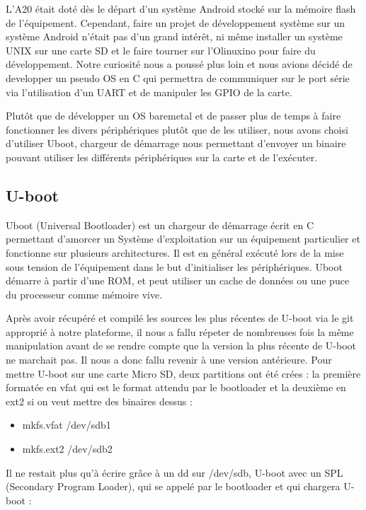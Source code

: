 \documentclass[frenchb]{article}
\begin{document}
L'A20 était doté dès le départ d'un système Android stocké sur la mémoire flash de l'équipement. Cependant, faire un projet de développement système sur un système Android n'était pas d'un grand intérêt, ni même installer un système UNIX sur une carte SD et le faire tourner sur l'Olinuxino pour faire du développement. Notre curiosité nous a poussé plus loin et nous avions décidé de developper un pseudo OS en C qui permettra de communiquer sur le port série via l'utilisation d'un UART et de manipuler les GPIO de la carte.

Plutôt que de développer un OS baremetal et de passer plus de temps à faire fonctionner les divers périphériques plutôt que de les utiliser, nous avons choisi d'utiliser Uboot, chargeur de démarrage nous permettant d'envoyer un binaire pouvant utiliser les différents périphériques sur la carte et de l'exécuter.
 
\subsection{U-boot}

Uboot (Universal Bootloader) est un chargeur de démarrage écrit en C permettant d'amorcer un Système d'exploitation sur un équipement particulier et fonctionne sur plusieurs architectures. Il est en général exécuté lors de la mise sous tension de l'équipement dans le but d'initialiser les périphériques. Uboot démarre à partir d'une ROM, et peut utiliser un cache de données ou une puce du processeur comme mémoire vive.

Après avoir récupéré et compilé les sources les plus récentes de U-boot via le git approprié à notre plateforme, il nous a fallu répeter de nombreuses fois la même manipulation avant de se rendre compte que la version la plus récente de U-boot ne marchait pas. Il nous a donc fallu revenir à une version antérieure.
Pour mettre U-boot sur une carte Micro SD, deux partitions ont été crées : la première formatée en vfat qui est le format attendu par le bootloader et la deuxième en ext2 si on veut mettre des binaires dessus :

\begin{itemize}
  \item \textsf{mkfs.vfat /dev/sdb1}
  \item \textsf{mkfs.ext2 /dev/sdb2}
 \end{itemize}

Il ne restait plus qu'à écrire grâce à un dd sur /dev/sdb, U-boot avec un SPL (Secondary Program Loader), qui se appelé par le bootloader et qui chargera U-boot :
\end{document}
